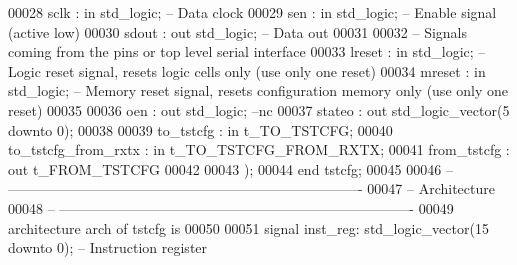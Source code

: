 \begin{DoxyCode}
00028       \textcolor{vhdlchar}{sclk}                 \textcolor{vhdlchar}{:} \textcolor{keywordflow}{in} \textcolor{comment}{std\_logic};\textcolor{keyword}{   -- Data clock}
00029       \textcolor{vhdlchar}{sen}                  \textcolor{vhdlchar}{:} \textcolor{keywordflow}{in} \textcolor{comment}{std\_logic};\textcolor{keyword}{   -- Enable signal (active low)}
00030       \textcolor{vhdlchar}{sdout}                \textcolor{vhdlchar}{:} \textcolor{keywordflow}{out} \textcolor{comment}{std\_logic};\textcolor{keyword}{  -- Data out}
00031    
00032 \textcolor{keyword}{      -- Signals coming from the pins or top level serial interface}
00033       \textcolor{vhdlchar}{lreset}               \textcolor{vhdlchar}{:} \textcolor{keywordflow}{in} \textcolor{comment}{std\_logic};\textcolor{keyword}{   -- Logic reset signal, resets logic cells only  (use only one
       reset)}
00034       \textcolor{vhdlchar}{mreset}               \textcolor{vhdlchar}{:} \textcolor{keywordflow}{in} \textcolor{comment}{std\_logic};\textcolor{keyword}{   -- Memory reset signal, resets configuration memory only (use
       only one reset)}
00035       
00036       \textcolor{vhdlchar}{oen}                  \textcolor{vhdlchar}{:} \textcolor{keywordflow}{out} \textcolor{comment}{std\_logic};\textcolor{keyword}{  --nc}
00037       \textcolor{vhdlchar}{stateo}               \textcolor{vhdlchar}{:} \textcolor{keywordflow}{out} \textcolor{comment}{std\_logic\_vector}\textcolor{vhdlchar}{(}\textcolor{vhdllogic}{}\textcolor{vhdllogic}{5} \textcolor{keywordflow}{downto} \textcolor{vhdllogic}{}\textcolor{vhdllogic}{0}\textcolor{vhdlchar}{)};
00038       
00039       \textcolor{vhdlchar}{to_tstcfg}            \textcolor{vhdlchar}{:} \textcolor{keywordflow}{in} \textcolor{vhdlchar}{t_TO_TSTCFG};
00040       \textcolor{vhdlchar}{to_tstcfg_from_rxtx}  \textcolor{vhdlchar}{:} \textcolor{keywordflow}{in} \textcolor{vhdlchar}{t_TO_TSTCFG_FROM_RXTX};
00041       \textcolor{vhdlchar}{from_tstcfg}          \textcolor{vhdlchar}{:} \textcolor{keywordflow}{out} \textcolor{vhdlchar}{t_FROM_TSTCFG}
00042 
00043    \textcolor{vhdlchar}{)};
00044 \textcolor{keywordflow}{end} \textcolor{vhdlchar}{tstcfg};
00045 
00046 \textcolor{keyword}{-- ----------------------------------------------------------------------------}
00047 \textcolor{keyword}{-- Architecture}
00048 \textcolor{keyword}{-- ----------------------------------------------------------------------------}
00049 \textcolor{keywordflow}{architecture} arch \textcolor{keywordflow}{of} tstcfg is
00050 
00051    \textcolor{keywordflow}{signal} \textcolor{vhdlchar}{inst_reg}\textcolor{vhdlchar}{:} \textcolor{comment}{std\_logic\_vector}\textcolor{vhdlchar}{(}\textcolor{vhdllogic}{}\textcolor{vhdllogic}{15} \textcolor{keywordflow}{downto} \textcolor{vhdllogic}{}\textcolor{vhdllogic}{0}\textcolor{vhdlchar}{)};\textcolor{keyword}{    -- Instruction register}

\end{DoxyCode}
